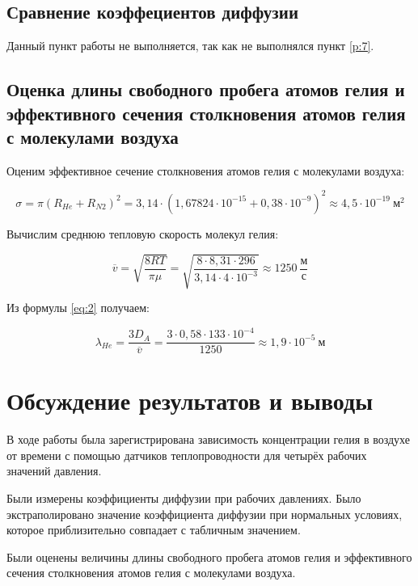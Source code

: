 \documentclass[a4paper,12pt]{article}
\begin{document}
\newpage

\subsection{Сравнение коэффециентов диффузии}

Данный пункт работы не выполняется, так как не выполнялся пункт \ref{p:7}.

\subsection{Оценка длины свободного пробега атомов гелия  и эффективного сечения столкновения атомов гелия с молекулами воздуха}


Оценим эффективное сечение столкновения атомов гелия с молекулами воздуха:

\begin{equation}
    \sigma = \pi \left( R_{He} + R_{N2} \right)^2 = 3,14 \cdot \left( 1,67824 \cdot 10^{-15} + 0,38 \cdot 10^{-9} \right)^2 \approx 4,5 \cdot 10^{-19} \ \text{м}^2
\end{equation}

Вычислим среднюю тепловую скорость молекул гелия:

\begin{equation*}
    \overline{v} = \sqrt{\frac{8RT}{\pi \mu}} = \sqrt{\frac{8 \cdot 8,31 \cdot 296}{3,14 \cdot 4 \cdot 10^{-3}}} \approx 1250 \ \frac{\text{м}}{\text{с}}
\end{equation*}

Из формулы \eqref{eq:2} получаем:

\begin{equation*}
    \lambda_{He} = \frac{3D_A}{\overline{v}} = \frac{3 \cdot 0,58 \cdot 133 \cdot 10^{-4}}{1250} \approx 1,9 \cdot 10^{-5} \ \text{м}
\end{equation*}

\section{Обсуждение результатов и выводы}

В ходе работы была зарегистрирована зависимость концентрации гелия в воздухе от времени с помощью датчиков теплопроводности для четырёх рабочих значений давления.

Были измерены коэффициенты диффузии при рабочих давлениях. Было экстраполировано значение коэффициента диффузии при нормальных условиях, которое приблизительно совпадает с табличным значением.

Были оценены величины длины свободного пробега атомов гелия  и эффективного сечения столкновения атомов гелия с молекулами воздуха.
\end{document}
